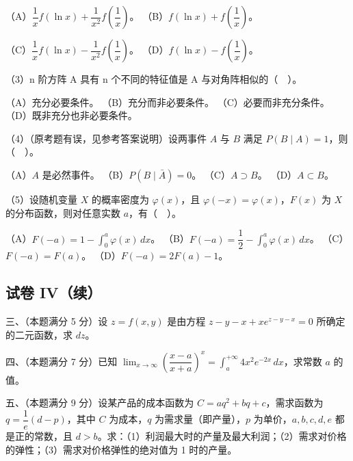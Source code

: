 \documentclass[UTF8,12pt]{ctexart}
\begin{document}
（A）\(\displaystyle \dfrac{\displaystyle 1}{\displaystyle x} f(\ln x)+\dfrac{\displaystyle 1}{\displaystyle x^2}f\left(\dfrac{\displaystyle 1}{\displaystyle x}\right)\)。 （B）\(\displaystyle f(\ln x)+f\left(\dfrac{\displaystyle 1}{\displaystyle x}\right)\)。


（C）\(\displaystyle \dfrac{\displaystyle 1}{\displaystyle x} f(\ln x)-\dfrac{\displaystyle 1}{\displaystyle x^2}f\left(\dfrac{\displaystyle 1}{\displaystyle x}\right)\)。 （D）\(\displaystyle f(\ln x)-f\left(\dfrac{\displaystyle 1}{\displaystyle x}\right)\)。


（3）n 阶方阵 A 具有 n 个不同的特征值是 A 与对角阵相似的（　）。


（A）充分必要条件。 （B）充分而非必要条件。 （C）必要而非充分条件。 （D）既非充分也非必要条件。


（4）（原考题有误，见参考答案说明）设两事件 \(\displaystyle A\) 与 \(\displaystyle B\) 满足 \(\displaystyle P(B\mid A)=1\)，则（　）。


（A）\(\displaystyle A\) 是必然事件。 （B）\(\displaystyle P(B\mid\bar A)=0\)。 （C）\(\displaystyle A\supset B\)。 （D）\(\displaystyle A\subset B\)。


（5）设随机变量 \(\displaystyle X\) 的概率密度为 \(\displaystyle \varphi(x)\)，且 \(\displaystyle \varphi(-x)=\varphi(x)\)，\(\displaystyle F(x)\) 为 \(\displaystyle X\) 的分布函数，则对任意实数 \(\displaystyle a\)，有（　）。


（A）\(\displaystyle F(-a)=1-\displaystyle \int_0^a\varphi(x)\,dx\)。 （B）\(\displaystyle F(-a)=\dfrac{\displaystyle 1}{\displaystyle 2}-\displaystyle \int_0^a\varphi(x)\,dx\)。 （C）\(\displaystyle F(-a)=F(a)\)。 （D）\(\displaystyle F(-a)=2F(a)-1\)。


\subsection*{试卷 IV（续）}

三、（本题满分 5 分）设 \(\displaystyle z=f(x,\allowbreak y)\) 是由方程 \(\displaystyle z-y-x+xe^{z-y-x}=0\) 所确定的二元函数，求 \(\displaystyle dz\)。


四、（本题满分 7 分）已知 \(\displaystyle \lim_{x\to\infty}\left(\dfrac{\displaystyle x-a}{\displaystyle x+a}\right)^x=\displaystyle \int_a^{+\infty}4x^2e^{-2x}\,dx\)，求常数 \(\displaystyle a\) 的值。


五、（本题满分 9 分）设某产品的成本函数为 \(\displaystyle C=aq^2+bq+c\)，需求函数为 \(\displaystyle q=\dfrac{\displaystyle 1}{\displaystyle e}(d-p)\)，其中 \(\displaystyle C\) 为成本，\(\displaystyle q\) 为需求量（即产量），\(\displaystyle p\) 为单价，\(\displaystyle a,\allowbreak b,\allowbreak c,\allowbreak d,\allowbreak e\) 都是正的常数，且 \(\displaystyle d>b\)。求：（1）利润最大时的产量及最大利润；（2）需求对价格的弹性；（3）需求对价格弹性的绝对值为 1 时的产量。
\end{document}
